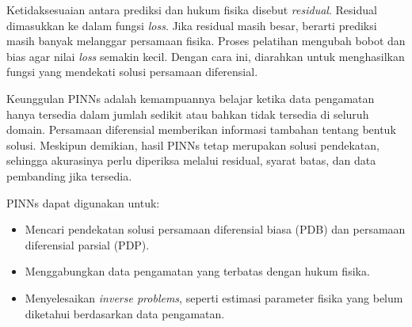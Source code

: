 \documentclass[12pt, letterpaper]{article}
\begin{document}
Ketidaksesuaian antara prediksi dan hukum fisika disebut \textit{residual}. Residual dimasukkan ke dalam fungsi \textit{loss}. Jika
residual masih besar, berarti prediksi masih banyak melanggar persamaan fisika. Proses pelatihan mengubah bobot dan bias agar nilai
\textit{loss} semakin kecil. Dengan cara ini, diarahkan untuk menghasilkan fungsi yang mendekati solusi persamaan diferensial.

Keunggulan PINNs adalah kemampuannya belajar ketika data pengamatan hanya tersedia dalam jumlah sedikit atau bahkan tidak tersedia di seluruh domain. Persamaan diferensial memberikan informasi tambahan tentang bentuk solusi. Meskipun demikian, hasil PINNs tetap merupakan solusi pendekatan, sehingga akurasinya perlu diperiksa melalui residual, syarat batas, dan data pembanding jika tersedia.

PINNs dapat digunakan untuk:
\begin{itemize}
    \item Mencari pendekatan solusi persamaan diferensial biasa (PDB) dan
          persamaan diferensial parsial (PDP).
    \item Menggabungkan data pengamatan yang terbatas dengan hukum fisika.
    \item Menyelesaikan \textit{inverse problems}, seperti estimasi parameter
          fisika yang belum diketahui berdasarkan data pengamatan.
\end{itemize}
\end{document}
